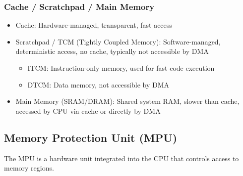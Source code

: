   \subsubsection{Cache / Scratchpad / Main Memory}
  \begin{itemize}
    \item Cache: Hardware-managed, transparent, fast access
    \item Scratchpad / TCM (Tightly Coupled Memory): Software-managed, deterministic access, no cache, typically not accessible by DMA
    \begin{itemize}
      \item ITCM: Instruction-only memory, used for fast code execution
      \item DTCM: Data memory, not accessible by DMA
    \end{itemize}
    \item Main Memory (SRAM/DRAM): Shared system RAM, slower than cache, accessed by CPU via cache or directly by DMA
  \end{itemize}

\subsection{Memory Protection Unit (MPU)}
  The MPU is a hardware unit integrated into the CPU that controls access to memory regions.

